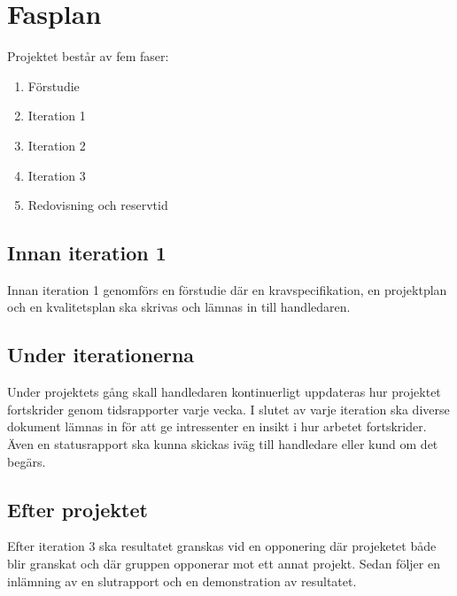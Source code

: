 \section{Fasplan}
Projektet består av fem faser:
\begin{enumerate}
\item Förstudie
\item Iteration 1
\item Iteration 2
\item Iteration 3
\item Redovisning och reservtid
\end{enumerate}

\subsection{Innan iteration 1}
Innan iteration 1 genomförs en förstudie där en  kravspecifikation, en projektplan och en kvalitetsplan ska skrivas och lämnas in till handledaren. 

\subsection{Under iterationerna}
Under projektets gång skall handledaren kontinuerligt uppdateras hur projektet fortskrider genom tidsrapporter varje vecka. I slutet av varje iteration ska diverse dokument lämnas in för att ge intressenter en insikt i hur arbetet fortskrider. Även en statusrapport ska kunna skickas iväg till handledare eller kund om det begärs. 

\subsection{Efter projektet}
Efter iteration 3 ska resultatet granskas vid en opponering där projeketet både blir granskat och där gruppen opponerar mot ett annat projekt. Sedan följer en inlämning av en slutrapport och en demonstration av resultatet. 